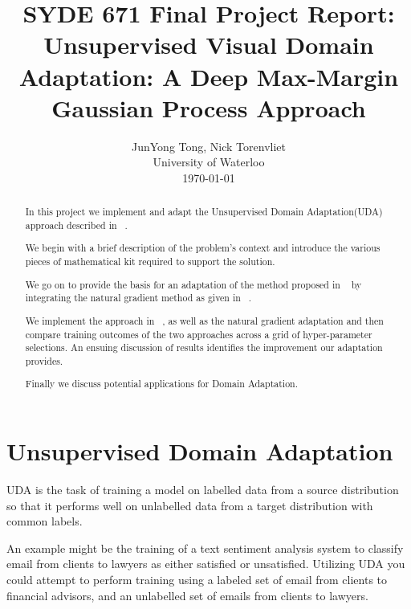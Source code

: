 \documentclass[10pt,twocolumn,letterpaper]{article}
\begin{document}
\title{SYDE 671 Final Project Report:\\
Unsupervised Visual Domain Adaptation: A Deep Max-Margin Gaussian Process Approach}

\author{JunYong Tong, Nick Torenvliet\\
University of Waterloo\\
\today
}

\maketitle

\begin{abstract}
In this project we implement and adapt the Unsupervised Domain Adaptation(UDA) approach described in ~\cite{kim2019unsupervised}.

We begin with a brief description of the problem's context and introduce the various pieces of mathematical kit required to support the solution.  

We go on to provide the basis for an adaptation of the method proposed in ~\cite{kim2019unsupervised} by integrating the natural gradient method as given in ~\cite{khan2018fast}.  

We implement the approach in ~\cite{kim2019unsupervised}, as well as the natural gradient adaptation and then compare training outcomes of the two approaches across a grid of hyper-parameter selections.  An ensuing discussion of results identifies the improvement our adaptation provides.

Finally we discuss potential applications for Domain Adaptation.
\end{abstract}

\section{Unsupervised Domain Adaptation}
UDA is the task of training a model on labelled data from a source distribution so that it performs well on unlabelled data from a target distribution with common labels. 

An example might be the training of a text sentiment analysis system to classify email from clients to lawyers as either satisfied or unsatisfied.  Utilizing UDA you could attempt to perform training using a labeled set of email from clients to financial advisors, and an unlabelled set of emails from clients to lawyers.  
\end{document}
